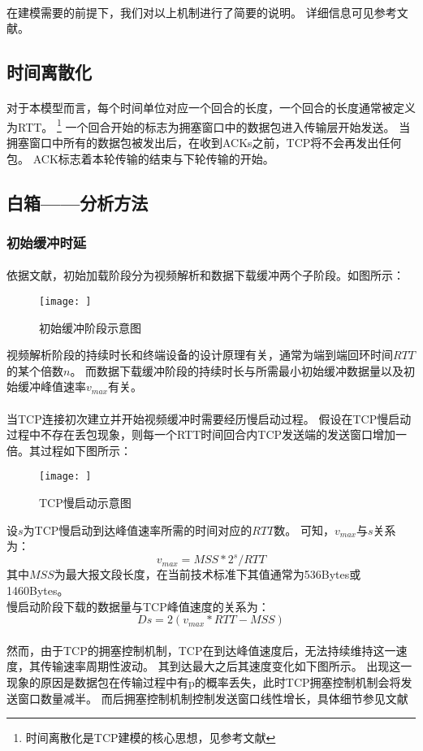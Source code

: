 \documentclass[UTF8]{ctexart}
\begin{document}
\paragraph{}
在建模需要的前提下，我们对以上机制进行了简要的说明。
详细信息可见参考文献\cite{}\cite{}。

\subsection{时间离散化}
\paragraph{}
对于本模型而言，每个时间单位对应一个回合的长度，一个回合的长度通常被定义为RTT。
\footnote{时间离散化是TCP建模的核心思想，见参考文献\cite{}\cite{}}
一个回合开始的标志为拥塞窗口中的数据包进入传输层开始发送。
当拥塞窗口中所有的数据包被发出后，在收到ACKs之前，TCP将不会再发出任何包。
ACK标志着本轮传输的结束与下轮传输的开始。

\subsection{白箱——分析方法}
\subsubsection{初始缓冲时延}
\paragraph{}
依据文献\cite{}，初始加载阶段分为视频解析和数据下载缓冲两个子阶段。如图所示：
\begin{figure}
    \centering
    \texttt{[image: ]}
    \caption{初始缓冲阶段示意图}
\end{figure}
视频解析阶段的持续时长和终端设备的设计原理有关，通常为端到端回环时间$RTT$的某个倍数$n$。
而数据下载缓冲阶段的持续时长与所需最小初始缓冲数据量以及初始缓冲峰值速率$v_{max}$有关。

\paragraph{}
当TCP连接初次建立并开始视频缓冲时需要经历慢启动过程。
假设在TCP慢启动过程中不存在丢包现象，则每一个RTT时间回合内TCP发送端的发送窗口增加一倍。其过程如下图所示：
\begin{figure}
    \centering
    \texttt{[image: ]}
    \caption{TCP慢启动示意图}
\end{figure}

设$s$为TCP慢启动到达峰值速率所需的时间对应的$RTT$数。
可知，$v_{max}$与$s$关系为：
\[v_{max}=MSS*2^{s}/RTT\]
其中$MSS$为最大报文段长度，在当前技术标准下其值通常为536Bytes或1460Bytes\cite{}。
\\
慢启动阶段下载的数据量与TCP峰值速度的关系为：
\[Ds= 2(v_{max}*RTT-MSS)\]
\\
然而，由于TCP的拥塞控制机制，TCP在到达峰值速度后，无法持续维持这一速度，其传输速率周期性波动。
其到达最大之后其速度变化如下图所示。
出现这一现象的原因是数据包在传输过程中有p的概率丢失，此时TCP拥塞控制机制会将发送窗口数量减半。
而后拥塞控制机制控制发送窗口线性增长，具体细节参见文献\cite{}
\end{document}
